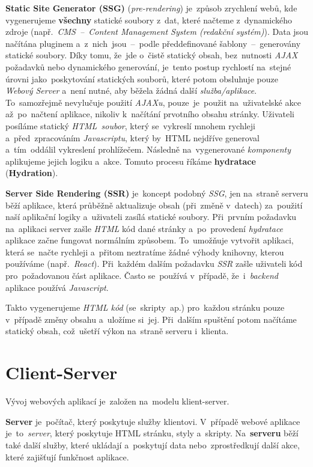 \documentclass[11pt,a4paper]{report}
\begin{document}
            \textbf{Static Site Generator (SSG)} (\emph{pre-rendering}) je~způsob zrychlení webů, kde vygenerujeme \textbf{všechny} statické soubory z~dat, které načteme z~dynamického zdroje (např.~\emph{CMS~--~Content Management System (redakční systém)}). Data jsou načítána pluginem a~z~nich~jsou~--~podle předdefinované šablony~--~generovány statické soubory. Díky tomu, že~jde o~čistě statický obsah, bez~nutnosti \emph{AJAX} požadavků nebo dynamického generování, je~tento postup rychlostí na~stejné úrovni jako~poskytování statických souborů, které potom obsluhuje pouze \emph{Webový Server} a~není nutné, aby běžela žádná další \emph{služba/aplikace}. To~samozřejmě nevylučuje použití \emph{AJAXu}, pouze~je~použit na~uživatelské akce až~po~načtení aplikace, nikoliv k~načítání prvotního obsahu stránky. Uživateli posíláme statický \emph{HTML~soubor}, který se~vykreslí mnohem rychleji a~před~zpracováním \emph{Javascriptu}, který by~HTML nejdříve generoval a~tím~oddálil vykreslení prohlížečem. Následně na~vygenerované \emph{komponenty} aplikujeme jejich logiku a~akce. Tomuto procesu říkáme \textbf{hydratace} (\textbf{Hydration}).

            \textbf{Server Side Rendering (SSR)} je~koncept podobný \emph{SSG}, jen na~straně serveru běží aplikace, která průběžně aktualizuje obsah (při~změně v~datech) za~použití naší aplikační logiky a~uživateli zasílá statické soubory. Při~prvním požadavku na~aplikaci server zašle \emph{HTML} kód dané stránky a~po~provedení \emph{hydratace} aplikace začne fungovat normálním způsobem. To~umožňuje vytvořit aplikaci, která se~načte rychleji a~přitom neztratíme žádné výhody knihovny, kterou používáme (např.~\emph{React}). Při~každém dalším požadavku \emph{SSR} zašle uživateli kód pro~požadovanou část aplikace. Často se~používá v~případě, že~i~\emph{backend} aplikace používá \emph{Javascript}. \cite{uc:ssrandssg}

            Takto vygenerujeme \emph{HTML kód} (se~skripty~ap.) pro~každou stránku pouze v~případě změny obsahu a~uložíme si~jej. Při~dalším spuštění potom načítáme statický obsah, což~ušetří výkon na~straně serveru i~klienta.

        \section{Client-Server}
            Vývoj webových aplikací je~založen na~modelu klient-server.

            \textbf{Server} je~počítač, který poskytuje služby klientovi. V~případě webové aplikace je~to~\emph{server}, který poskytuje HTML stránku, styly a~skripty. Na~\textbf{serveru} běží také další služby, které ukládají a~poskytují data nebo~zprostředkují další akce, které zajišťují funkčnost aplikace.
\end{document}
